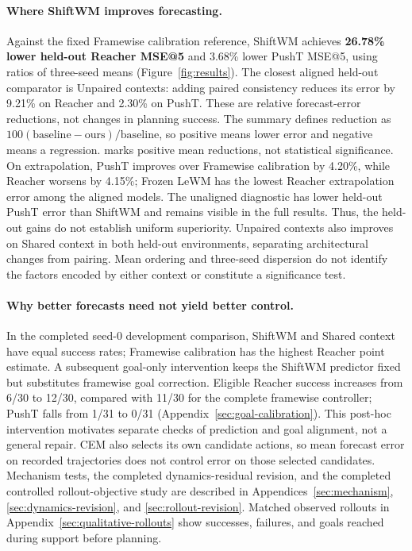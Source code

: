 \paragraph{Where ShiftWM improves forecasting.}
Against the fixed Framewise calibration reference, ShiftWM achieves
\textbf{26.78\% lower held-out Reacher MSE@5} and 3.68\% lower PushT MSE@5,
using ratios of three-seed means (Figure~\ref{fig:results}). The closest
aligned held-out comparator is Unpaired contexts: adding paired consistency
reduces its error by 9.21\% on Reacher and 2.30\% on PushT. These are
relative forecast-error reductions, not changes in planning success.
The summary defines reduction as $100(\mathrm{baseline}-\mathrm{ours})/
\mathrm{baseline}$, so positive means lower error and negative means a
regression.  marks positive mean reductions, not
statistical significance. On extrapolation, PushT improves over Framewise calibration by
4.20\%, while Reacher worsens by 4.15\%; Frozen LeWM has the lowest
Reacher extrapolation error among the aligned models. The unaligned
diagnostic has lower held-out PushT error than ShiftWM and remains visible
in the full results. Thus, the held-out gains do not establish uniform
superiority. Unpaired contexts also improves on Shared context in both
held-out environments, separating architectural changes from pairing.
Mean ordering and three-seed dispersion do not identify the factors encoded
by either context or constitute a significance test.


\paragraph{Why better forecasts need not yield better control.}
In the completed seed-0 development comparison, ShiftWM and Shared context
have equal success rates; Framewise calibration has the highest Reacher
point estimate. A subsequent goal-only intervention keeps the ShiftWM
predictor fixed but substitutes framewise goal correction. Eligible Reacher
success increases from 6/30 to 12/30, compared with 11/30 for the complete
framewise controller; PushT falls from 1/31 to 0/31
(Appendix~\ref{sec:goal-calibration}). This post-hoc intervention motivates
separate checks of prediction and goal alignment, not a general repair.
CEM also selects its own candidate actions, so mean forecast error on
recorded trajectories does not control error on those selected candidates.
Mechanism tests, the completed dynamics-residual revision, and the completed
controlled rollout-objective study are described in
Appendices~\ref{sec:mechanism}, \ref{sec:dynamics-revision}, and
\ref{sec:rollout-revision}.
Matched observed rollouts in Appendix~\ref{sec:qualitative-rollouts}
show successes, failures, and goals reached during support before planning.

